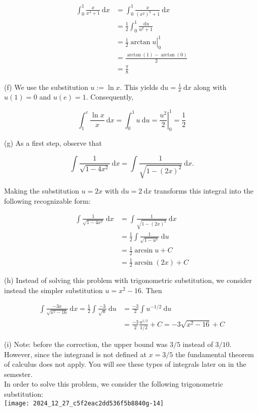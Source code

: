 \documentclass[10pt]{article}
\begin{document}
$$
\begin{aligned}
\int_{0}^{1} \frac{x}{x^{4}+1} \mathrm{~d} x & =\int_{0}^{1} \frac{x}{\left(x^{2}\right)^{2}+1} \mathrm{~d} x \\
& =\frac{1}{2} \int_{0}^{1} \frac{\mathrm{~d} u}{u^{2}+1} \\
& =\left.\frac{1}{2} \arctan u\right|_{0} ^{1} \\
& =\frac{\arctan (1)-\arctan (0)}{2} \\
& =\frac{\pi}{8}
\end{aligned}
$$

(f) We use the substitution $u:=\ln x$. This yields $\mathrm{d} u=\frac{1}{x} \mathrm{~d} x$ along with $u(1)=0$ and $u(e)=1$. Consequently,

$$
\int_{1}^{e} \frac{\ln x}{x} \mathrm{~d} x=\int_{0}^{1} u \mathrm{~d} u=\left.\frac{u^{2}}{2}\right|_{0} ^{1}=\frac{1}{2}
$$

(g) As a first step, observe that

$$
\int \frac{1}{\sqrt{1-4 x^{2}}} \mathrm{~d} x=\int \frac{1}{\sqrt{1-(2 x)^{2}}} \mathrm{~d} x .
$$

Making the substitution $u=2 x$ with $\mathrm{d} u=2 \mathrm{~d} x$ transforms this integral into the following recognizable form:

$$
\begin{aligned}
\int \frac{1}{\sqrt{1-4 x^{2}}} \mathrm{~d} x & =\int \frac{1}{\sqrt{1-(2 x)^{2}}} \mathrm{~d} x \\
& =\frac{1}{2} \int \frac{1}{\sqrt{1-u^{2}}} \mathrm{~d} u \\
& =\frac{1}{2} \arcsin u+C \\
& =\frac{1}{2} \arcsin (2 x)+C
\end{aligned}
$$

(h) Instead of solving this problem with trigonometric substitution, we consider instead the simpler substitution $u=x^{2}-16$. Then

$$
\begin{aligned}
\int \frac{-3 x}{\sqrt{x^{2}-16}} \mathrm{~d} x=\frac{1}{2} \int \frac{-3}{\sqrt{u}} \mathrm{~d} u & =\frac{-3}{2} \int u^{-1 / 2} \mathrm{~d} u \\
& =\frac{-3}{2} \frac{u^{1 / 2}}{1 / 2}+C=-3 \sqrt{x^{2}-16}+C
\end{aligned}
$$

(i) Note: before the correction, the upper bound was $3 / 5$ instead of $3 / 10$. However, since the integrand is not defined at $x=3 / 5$ the fundamental theorem of calculus does not apply. You will see these types of integrals later on in the semester.\\
In order to solve this problem, we consider the following trigonometric substitution:\\
\texttt{[image: 2024\_12\_27\_c5f2eac2dd536f5b8840g-14]}
\end{document}
